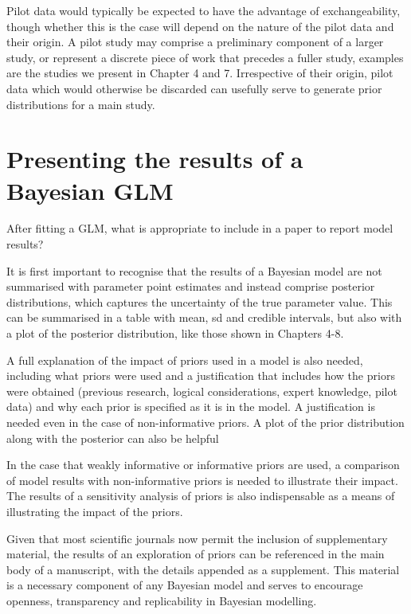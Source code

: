 \documentclass[
]{book}
\begin{document}
Pilot data would typically be expected to have the advantage of exchangeability, though whether this is the case will depend on the nature of the pilot data and their origin. A pilot study may comprise a preliminary component of a larger study, or represent a discrete piece of work that precedes a fuller study, examples are the studies we present in Chapter 4 and 7. Irrespective of their origin, pilot data which would otherwise be discarded can usefully serve to generate prior distributions for a main study.

\hypertarget{presenting-the-results-of-a-bayesian-glm}{%
\section{Presenting the results of a Bayesian GLM}\label{presenting-the-results-of-a-bayesian-glm}}

After fitting a GLM, what is appropriate to include in a paper to report model results?

It is first important to recognise that the results of a Bayesian model are not summarised with parameter point estimates and instead comprise posterior distributions, which captures the uncertainty of the true parameter value. This can be summarised in a table with mean, sd and credible intervals, but also with a plot of the posterior distribution, like those shown in Chapters 4-8.

A full explanation of the impact of priors used in a model is also needed, including what priors were used and a justification that includes how the priors were obtained (previous research, logical considerations, expert knowledge, pilot data) and why each prior is specified as it is in the model. A justification is needed even in the case of non-informative priors. A plot of the prior distribution along with the posterior can also be helpful

In the case that weakly informative or informative priors are used, a comparison of model results with non-informative priors is needed to illustrate their impact. The results of a sensitivity analysis of priors is also indispensable as a means of illustrating the impact of the priors.

Given that most scientific journals now permit the inclusion of supplementary material, the results of an exploration of priors can be referenced in the main body of a manuscript, with the details appended as a supplement. This material is a necessary component of any Bayesian model and serves to encourage openness, transparency and replicability in Bayesian modelling.
\end{document}

